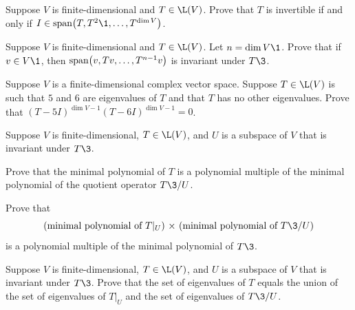 \begin{exercises}
\exercise
Suppose $V$ is finite-dimensional and $T \in \L(V)$.  Prove that $T$ is invertible if and only if
$I \in \Span\paren[\big]{T, T^2\1, \ldots, T^{\dim V}}$.


\exercise
Suppose $V$ is finite-dimensional and $T \in \L(V)$. Let $n = \dim V\1$. Prove that if $v \in V\1$, then
$
\Span\paren[\big]{v, Tv, \ldots, T^{n-1}v}
$
is invariant under $T\3$.


\exercise
Suppose $V$ is a finite-dimensional complex vector space.  Suppose $T \in \L(V)$ is such that $5$
and $6$ are eigenvalues of $T$ and that $T$ has no other eigenvalues.  Prove
that
$
(T - 5I)^{\dim V-1} (T - 6I)^{\dim V-1} = 0$.


\exercise
Suppose $V$ is finite-dimensional, $T \in \L(V)$, and $U$ is a subspace of $V$ that is invariant under $T\3$.\label{8minq}
\begin{subtheorem}
\item
Prove that the minimal polynomial of $T$ is a polynomial multiple of the minimal polynomial of the quotient operator $T\3/U$.
\item
Prove that
\[
\text{(minimal polynomial of $T|_U$) $\times$ (minimal polynomial of $T\3/U$)}
\]
is a polynomial multiple of the minimal polynomial of $T\3$.
\end{subtheorem}
\vspace{-0.03in}


\exercise
Suppose $V$ is finite-dimensional, $T \in \L(V)$, and $U$ is a subspace of $V$ that is invariant under $T\3$. Prove that the set of eigenvalues of $T$ equals the union of the set of eigenvalues of $T|_U$ and the set of eigenvalues of $T\3/U$.

\end{exercises}

